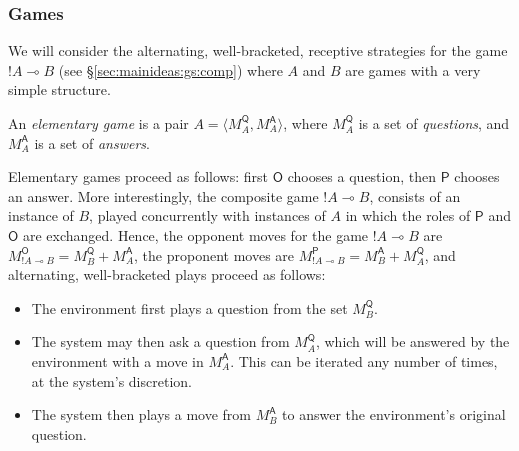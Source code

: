 \documentclass[acmsmall,timestamp,review,anonymous]{acmart}
\newcommand{\kw}[1]{\ensuremath{ \mathsf{#1} }}
\begin{document}
\subsubsection{Games} %

We will consider the alternating, well-bracketed, receptive strategies
for the game $!A \multimap B$ (see \S\ref{sec:mainideas:gs:comp})
where $A$ and $B$ are games with a very simple structure.

\begin{definition} \label{def:elemgame} %
An \emph{elementary game} is a pair
$A = \langle M_A^\kw{Q}, M_A^\kw{A} \rangle$, where
$M_A^\kw{Q}$ is a set of \emph{questions}, and
$M_A^\kw{A}$ is a set of \emph{answers}.
\end{definition}

Elementary games proceed as follows:
first $\kw{O}$ chooses a question,
then $\kw{P}$ chooses an answer.
More interestingly,
the composite game $!A \multimap B$,
consists of
an instance of $B$, played concurrently with
instances of $A$ in which the roles of $\kw{P}$ and $\kw{O}$ are exchanged.
Hence,
the opponent moves for the game $!A \multimap B$ are
$M^\kw{O}_{!A \multimap B} = M^\kw{Q}_B + M^\kw{A}_A$,
the proponent moves are
$M^\kw{P}_{!A \multimap B} = M^\kw{A}_B + M^\kw{Q}_A$,
and alternating, well-bracketed plays
proceed as follows:
\begin{itemize}
  \item The environment first plays a question from the set $M_B^\kw{Q}$.
  \item The system may then ask a question from $M_A^\kw{Q}$,
    which will be answered by the environment with a move in $M_A^\kw{A}$.
    This can be iterated any number of times, at the system's discretion.
  \item The system then plays a move from $M_B^\kw{A}$
    to answer the environment's original question.
\end{itemize}
\end{document}
